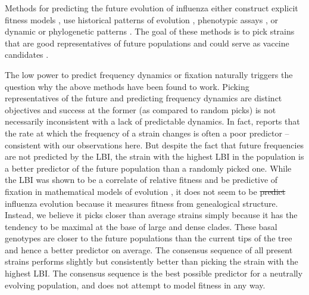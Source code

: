 \documentclass[reprint,amsmath,amssymb,superscriptaddress,showpacs,rmp]{revtex4-1}
\providecommand{\DIFadd}[1]{{\protect\color{blue}\uwave{#1}}} %
\providecommand{\DIFdel}[1]{{\protect\color{red}\sout{#1}}}                      %
\providecommand{\DIFaddbegin}{} %
\providecommand{\DIFaddend}{} %
\providecommand{\DIFdelbegin}{} %
\providecommand{\DIFdelend}{} %
\newcommand{\DIFscaledelfig}{0.5}
\newlength{\DIFdelgraphicswidth} %
\newlength{\DIFdelgraphicsheight} %
\newcommand{\DIFaddincludegraphics}[2][]{{\color{blue}\fbox{\DIFOincludegraphics[#1]{#2}}}} %
\newcommand{\DIFdelincludegraphics}[2][]{%
\sbox{\DIFdelgraphicsbox}{\DIFOincludegraphics[#1]{#2}}%
\settoboxwidth{\DIFdelgraphicswidth}{\DIFdelgraphicsbox} %
\settoboxtotalheight{\DIFdelgraphicsheight}{\DIFdelgraphicsbox} %
\scalebox{\DIFscaledelfig}{%
\parbox[b]{\DIFdelgraphicswidth}{\usebox{\DIFdelgraphicsbox}\\[-\baselineskip] \rule{\DIFdelgraphicswidth}{0em}}\llap{\resizebox{\DIFdelgraphicswidth}{\DIFdelgraphicsheight}{%
\setlength{\unitlength}{\DIFdelgraphicswidth}%
\begin{picture}(1,1)%
\thicklines\linethickness{2pt} %
{\color[rgb]{1,0,0}\put(0,0){\framebox(1,1){}}}%
{\color[rgb]{1,0,0}\put(0,0){\line( 1,1){1}}}%
{\color[rgb]{1,0,0}\put(0,1){\line(1,-1){1}}}%
\end{picture}%
}\hspace*{3pt}}} %
} %
\DeclareRobustCommand{\DIFaddbegin}{\DIFOaddbegin \let\includegraphics\DIFaddincludegraphics} %
\DeclareRobustCommand{\DIFaddend}{\DIFOaddend \let\includegraphics\DIFOincludegraphics} %
\DeclareRobustCommand{\DIFdelbegin}{\DIFOdelbegin \let\includegraphics\DIFdelincludegraphics} %
\DeclareRobustCommand{\DIFdelend}{\DIFOaddend \let\includegraphics\DIFOincludegraphics} %
\begin{document}

Methods for predicting the future evolution of influenza either construct explicit fitness models \citep{luksza_predictive_2014,huddleston_integrating_2020}, use historical patterns of evolution \citep{luksza_predictive_2014,bush_predicting_1999}, phenotypic assays \citep{neher_prediction_2016,steinbruck_inference_2012}, or dynamic or phylogenetic patterns \citep{neher_predicting_2014,klingen_sweep_2018}.
The goal of these methods is to pick strains that are good representatives of future populations and could serve as vaccine candidates \citep{morris2018predictive}.


The low power to predict frequency dynamics or fixation naturally triggers the question why the above methods have been found to work.
Picking representatives of the future and predicting frequency dynamics are distinct objectives and success at the former (as compared to random picks) is not necessarily inconsistent with a lack of predictable dynamics.
In fact, \citep{huddleston_integrating_2020} reports that the rate at which the frequency of a strain changes is often a poor predictor -- consistent with our observations here.
But despite the fact that future frequencies are not predicted by the LBI, the strain with the highest LBI in the population is a better predictor of the future population than a randomly picked one.
While the LBI was shown to be a correlate of relative fitness and be predictive of fixation in mathematical models of evolution \citep{neher_predicting_2014}, it does not seem to be \DIFdelbegin \DIFdel{predict }\DIFdelend \DIFaddbegin \DIFadd{predictive of }\DIFaddend influenza evolution because it measures fitness from genealogical structure.
Instead, we believe it picks closer than average strains simply because it has the tendency to be maximal at the base of large and dense clades.
These basal genotypes are closer to the future populations than the current tips of the tree and hence a better predictor on average.
The consensus sequence of all present strains performs slightly but consistently better than picking the strain with the highest LBI.
The consensus sequence is the best possible predictor for a neutrally evolving population, and does not attempt to model fitness in any way.
\end{document}
